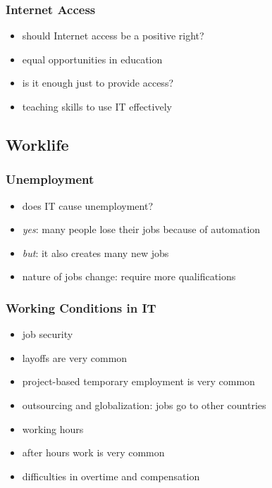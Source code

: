 \documentclass[dvipsnames]{beamer}
\theoremstyle{plain}
\begin{document}
\begin{frame}
  \frametitle{Internet Access}

  \begin{itemize}
    \item should Internet access be a positive right?
    \item equal opportunities in education

    \medskip
    \item is it enough just to provide access?
    \item teaching skills to use IT effectively
  \end{itemize}
\end{frame}

\subsection{Worklife}

\begin{frame}
  \frametitle{Unemployment}

  \begin{itemize}
    \item does IT cause unemployment?

    \bigskip
    \item \emph{yes}: many people lose their jobs because of automation
    \item \emph{but}: it also creates many new jobs
    \item nature of jobs change: require more qualifications
  \end{itemize}
\end{frame}

\begin{frame}
  \frametitle{Working Conditions in IT}

  \begin{itemize}
    \item job security
    \item layoffs are very common
    \item project-based temporary employment is very common
    \item outsourcing and globalization: jobs go to other countries

    \pause
    \medskip
    \item working hours
    \item after hours work is very common
    \item difficulties in overtime and compensation
  \end{itemize}
\end{frame}
\end{document}

